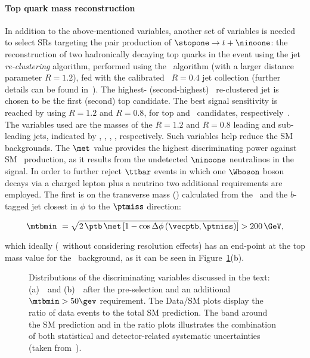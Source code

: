 			\paragraph*{Top quark mass reconstruction}

				In addition to the above-mentioned variables, another set of variables is needed to select \acp{SR} targeting the pair production of $\stopone \to t + \ninoone$: the reconstruction of two hadronically decaying top quarks in the event using the jet \emph{re-clustering} algorithm, performed using the \antikt\ algorithm (with a larger distance parameter $R = 1.2$), fed with the calibrated \antikt\ $R = 0.4$ jet collection (further details can be found in~\cite{Antikt2008}). The highest- (second-highest) \pt\ re-clustered jet is chosen to be the first (second) top candidate. The best signal sensitivity is reached by using $R = 1.2$ and $R = 0.8$, for top and \Wboson\ candidates, respectively~\cite{stop0L,ICHEPstop0L}. The variables used are the masses of the $R=1.2$ and $R=0.8$ leading and sub-leading jets, indicated by \mantikttwelvezero, \mantikttwelveone, \mantikteightzero, \mantikteightone, respectively. Such variables help reduce the \ac{SM} backgrounds. %
				The $\met$ value provides the highest discriminating power against \ac{SM} \ttbar\ production, as it results from the undetected $\ninoone$ neutralinos in the signal. In order to further reject $\ttbar$ events in which one $\Wboson$ boson decays via a charged lepton plus a neutrino two additional requirements are employed. The first is on the transverse mass (\mt) calculated from the \met\ and the $b$-tagged jet closest in $\phi$ to the $\ptmiss$ direction: 

				\begin{equation*}
					\mtbmin\ = \sqrt{2\,\ptb\,\met \left[1-\cos{\Delta\phi\left(\vecptb,\ptmiss\right)}\right]} > 200\,\GeV,
				\end{equation*}

				\noindent which ideally (\ie\ without considering resolution effects) has an end-point at the top mass value for the \ttbar\ background, as it can be seen in Figure~\ref{fig:preselection}(b).
				\begin{figure}[!htb]
				  \begin{center}
					  \caption{Distributions of the discriminating variables discussed in the text: (a)~\mantikttwelvezero\ and (b)~\mtbmin\ after the pre-selection and an additional $\mtbmin>50\gev$ requirement. The Data/\ac{SM} plots display the ratio of data events to the total \ac{SM} prediction. The band around the \ac{SM} prediction and in the ratio plots illustrates the combination of both statistical and detector-related systematic uncertainties (taken from~\cite{stop0L}).}
					  \label{fig:preselection}
				  \end{center}
				\end{figure}

